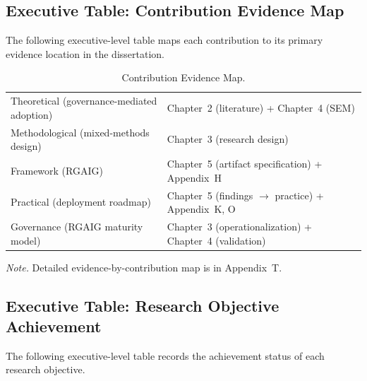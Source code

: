 \subsection{Executive Table: Contribution Evidence Map}
\label{sec:exec_contribution_evidence}

\noindent The following executive-level table maps each contribution to its primary evidence location in the dissertation.

{\tablestripes\tablefontsize
{}
\begin{xltabular}{\textwidth}{@{} >{\raggedright\arraybackslash}p{6cm} L @{}}
\caption[Contribution Evidence Map]{Contribution Evidence Map.}\label{tab:exec_contribution_evidence} \\
\toprule
{} &  \\
\midrule
\endfirsthead
\endhead
\bottomrule
\endlastfoot
Theoretical (governance-mediated adoption) & Chapter~2 (literature) + Chapter~4 (SEM) \\
\addlinespace
Methodological (mixed-methods design) & Chapter~3 (research design) \\
\addlinespace
Framework (RGAIG) & Chapter~5 (artifact specification) + Appendix~H \\
\addlinespace
Practical (deployment roadmap) & Chapter~5 (findings $\rightarrow$ practice) + Appendix~K, O \\
\addlinespace
Governance (RGAIG maturity model) & Chapter~3 (operationalization) + Chapter~4 (validation) \\
\end{xltabular}}
\vspace{0.3em}\noindent\textit{Note.} Detailed evidence-by-contribution map is in Appendix~T.


\subsection{Executive Table: Research Objective Achievement}
\label{sec:exec_objective_achievement}

\noindent The following executive-level table records the achievement status of each research objective.

